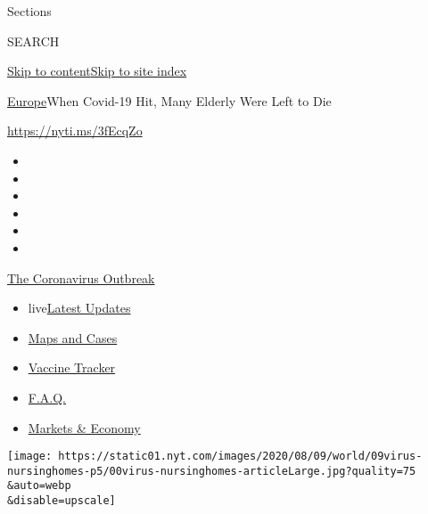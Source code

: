 Sections

SEARCH

\protect\hyperlink{site-content}{Skip to
content}\protect\hyperlink{site-index}{Skip to site index}

\href{/section/world/europe}{Europe}\textbar{}When Covid-19 Hit, Many
Elderly Were Left to Die

\href{https://nyti.ms/3fEcqZo}{https://nyti.ms/3fEcqZo}

\begin{itemize}
\item
\item
\item
\item
\item
\item
\end{itemize}

\href{https://www.nytimes.com/news-event/coronavirus?action=click\&pgtype=Article\&state=default\&region=TOP_BANNER\&context=storylines_menu}{The
Coronavirus Outbreak}

\begin{itemize}
\tightlist
\item
  live\href{https://www.nytimes.com/2020/08/08/world/coronavirus-updates.html?action=click\&pgtype=Article\&state=default\&region=TOP_BANNER\&context=storylines_menu}{Latest
  Updates}
\item
  \href{https://www.nytimes.com/interactive/2020/us/coronavirus-us-cases.html?action=click\&pgtype=Article\&state=default\&region=TOP_BANNER\&context=storylines_menu}{Maps
  and Cases}
\item
  \href{https://www.nytimes.com/interactive/2020/science/coronavirus-vaccine-tracker.html?action=click\&pgtype=Article\&state=default\&region=TOP_BANNER\&context=storylines_menu}{Vaccine
  Tracker}
\item
  \href{https://www.nytimes.com/interactive/2020/world/coronavirus-tips-advice.html?action=click\&pgtype=Article\&state=default\&region=TOP_BANNER\&context=storylines_menu}{F.A.Q.}
\item
  \href{https://www.nytimes.com/live/2020/08/07/business/stock-market-today-coronavirus?action=click\&pgtype=Article\&state=default\&region=TOP_BANNER\&context=storylines_menu}{Markets
  \& Economy}
\end{itemize}

\texttt{[image: https://static01.nyt.com/images/2020/08/09/world/09virus-nursinghomes-p5/00virus-nursinghomes-articleLarge.jpg?quality=75\\\&auto=webp\\\&disable=upscale]}

